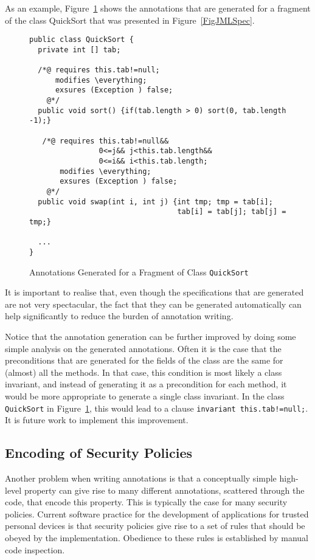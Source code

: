 As an example, Figure~\ref{FigAnnotSpec} shows the annotations that
are generated for a fragment of the class QuickSort that was presented in
Figure~\ref{FigJMLSpec}. 
\begin{figure}[t!]
{\small
\begin{verbatim}
public class QuickSort {
  private int [] tab;

  /*@ requires this.tab!=null;
      modifies \everything;
      exsures (Exception ) false;
    @*/
  public void sort() {if(tab.length > 0) sort(0, tab.length -1);}

   /*@ requires this.tab!=null&& 
                0<=j&& j<this.tab.length&&
                0<=i&& i<this.tab.length;
       modifies \everything;
       exsures (Exception ) false;
    @*/
  public void swap(int i, int j) {int tmp; tmp = tab[i]; 
                                  tab[i] = tab[j]; tab[j] = tmp;}

  ...
}
\end{verbatim}
}
\caption{Annotations Generated for a Fragment of Class
\texttt{QuickSort}}\label{FigAnnotSpec} 
\end{figure}
It is important to realise that, even though the specifications that
are generated are not very spectacular, the fact that they can be
generated automatically can help significantly to reduce the burden of
annotation writing.

Notice that the annotation generation can be further improved by doing
some simple analysis on the generated annotations. Often it is the
case that the preconditions that are generated for the fields of the
class are the same for (almost) all the methods. In that case, this
condition is most likely a class invariant, and instead of generating
it as a precondition for each method, it would be more appropriate to
generate a single class invariant. In the class \texttt{QuickSort} in
Figure~\ref{FigAnnotSpec}, this would lead to a clause
\texttt{invariant this.tab!=null;}. It is future work to implement
this improvement.

\subsection{Encoding of Security Policies}

Another problem when writing annotations is that a conceptually simple
high-level property can give rise to many different annotations,
scattered through the code, that encode this property. This is
typically the case for many security policies. Current software
practice for the development of applications for trusted personal
devices is that security policies give rise to a set of rules that
should be obeyed by the implementation. Obedience to these rules is
established by manual code inspection.

